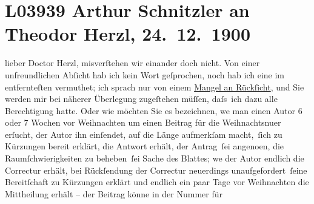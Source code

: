 

\section[Arthur Schnitzler an Theodor Herzl, 24. 12. 1900]{L03939 Arthur Schnitzler an Theodor Herzl, 24. 12. 1900}
\nopagebreak{}
\rehead{ }\normalsize\beginnumbering{}
\toendnotes[C]{\smallbreak\pagebreak[2]}
\toendnotes[C]{\smallbreak}
\toendnotes[C]{\smallbreak}
\pstart
           \noindent{}{\pb}lieber Doctor Herzl, misverſtehen wir
               einander doch nicht. Von einer unfreundlichen Abſicht hab ich kein Wort geſprochen,
               noch hab ich eine im entfernteſten vermuthet; ich sprach nur von einem \uline{Mangel an Rückſicht}, und Sie werden mir bei näherer
               Überlegung zugeſtehen müſſen, daſs ich dazu alle Berechtigung hatte. Oder wie möchten
               Sie es bezeichnen, we{\geminationn} man einen Autor 6 oder 7 Wochen {\pb}vor
                  Weihnachten um einen Beitrag für die Weihnachtsnu{\geminationm}er
               erſucht, der Autor ihn einſendet, auf die Länge aufmerkſam macht, ſich zu Kürzungen
               bereit erklärt, die Antwort erhält, der Antrag ſei angeno{\geminationm}en, die
               Raumſchwierigkeiten zu beheben ſei Sache des Blattes; we{\geminationn} der Autor endlich die
               Correctur erhält, bei Rückſendung der Correctur neuerdings unaufgefordert ſeine
               Bereitſchaft zu Kürzungen erklärt und endlich ein paar Tage vor Weihnachten die
               Mittheilung {\pb}erhält – der Beitrag könne in der Nummer für
